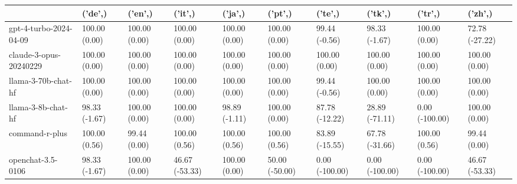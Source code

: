 \begin{tabular}{llllllllll}
\toprule
 & ('de',) & ('en',) & ('it',) & ('ja',) & ('pt',) & ('te',) & ('tk',) & ('tr',) & ('zh',) \\
\midrule
gpt-4-turbo-2024-04-09 & 100.00 (0.00) & 100.00 (0.00) & 100.00 (0.00) & 100.00 (0.00) & 100.00 (0.00) & 99.44 (-0.56) & 98.33 (-1.67) & 100.00 (0.00) & 72.78 (-27.22) \\
claude-3-opus-20240229 & 100.00 (0.00) & 100.00 (0.00) & 100.00 (0.00) & 100.00 (0.00) & 100.00 (0.00) & 100.00 (0.00) & 100.00 (0.00) & 100.00 (0.00) & 100.00 (0.00) \\
llama-3-70b-chat-hf & 100.00 (0.00) & 100.00 (0.00) & 100.00 (0.00) & 100.00 (0.00) & 100.00 (0.00) & 99.44 (-0.56) & 100.00 (0.00) & 100.00 (0.00) & 100.00 (0.00) \\
llama-3-8b-chat-hf & 98.33 (-1.67) & 100.00 (0.00) & 100.00 (0.00) & 98.89 (-1.11) & 100.00 (0.00) & 87.78 (-12.22) & 28.89 (-71.11) & 0.00 (-100.00) & 100.00 (0.00) \\
command-r-plus & 100.00 (0.56) & 99.44 (0.00) & 100.00 (0.56) & 100.00 (0.56) & 100.00 (0.56) & 83.89 (-15.55) & 67.78 (-31.66) & 100.00 (0.56) & 99.44 (0.00) \\
openchat-3.5-0106 & 98.33 (-1.67) & 100.00 (0.00) & 46.67 (-53.33) & 100.00 (0.00) & 50.00 (-50.00) & 0.00 (-100.00) & 0.00 (-100.00) & 0.00 (-100.00) & 46.67 (-53.33) \\
\bottomrule
\end{tabular}
